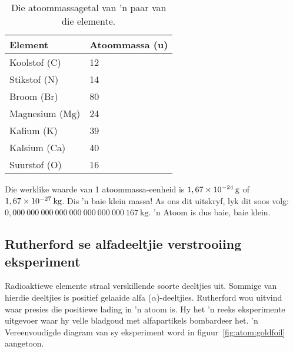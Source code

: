           \begin{table}[H]
        \begin{center}
      \label{m38756*uid8}
    \noindent
      \begin{tabular}{|l|l|}\hline
                  \textbf{Element}
                 &
                  \textbf{Atoommassa (u)}
                \\ \hline
        Koolstof ($\text{C}$) &
        12 \\ \hline
        Stikstof ($\text{N}$) &
        14 \\ \hline
        Broom ($\text{Br}$) &
        80 \\ \hline
        Magnesium ($\text{Mg}$) &
        24 \\ \hline
        Kalium ($\text{K}$) &
        39 \\ \hline
        Kalsium ($\text{Ca}$) &
        40 \\ \hline
        Suurstof ($\text{O}$) &
        16 \\ \hline
    \end{tabular}
      \end{center}
    \caption{Die atoommassagetal van 'n paar van die elemente.}
\label{tab:atomic mass}
\end{table}
    \par
        \label{m38756*id255096}
Die werklike waarde van 1 atoommassa-eenheid is $1,67\ensuremath{\times}{10}^{-24}\phantom{\rule{2pt}{0ex}}\text{g}$ of $1,67\ensuremath{\times}{10}^{-27}\phantom{\rule{2pt}{0ex}}\text{kg}$. Dis 'n baie klein massa! As ons dit uitskryf, lyk dit soos volg: $0,000~000~000~000~000~000~000~000~167~\text{kg}$. 'n Atoom is dus baie, baie klein.
            \subsection*{Rutherford se alfadeeltjie verstrooiing eksperiment}
            \nopagebreak
            \label{m38756*id254668}
Radioaktiewe elemente straal verskillende soorte deeltjies uit. Sommige van hierdie deeltjies is positief gelaaide alfa ($\alpha $)-deeltjies. Rutherford wou uitvind waar presies die positiewe lading in 'n atoom is. Hy het  'n reeks eksperimente uitgevoer waar hy velle bladgoud met alfapartikels bombardeer het.  'n Vereenvoudigde diagram van sy eksperiment word in figuur~\ref{fig:atom:goldfoil} aangetoon.\par 


